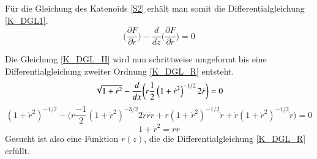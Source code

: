 \begin{refsection}
Für die Gleichung des Katenoids \eqref{S2} erhält man somit die Differentialgleichung \eqref{K_DGL1}.
\begin{equation} \label{K_DGL1}
\bigg(\frac{\partial F}{\partial r}\bigg)- \frac{d}{dz} \bigg(\frac{\partial F}{\partial \dot{r}}\bigg)=0    
\end{equation}

Die Gleichung \eqref{K_DGL_H} wird nun schrittweise umgeformt bis eine  Differentialgleichung zweiter Ordnung \eqref{K_DGL_R} entsteht.
\begin{equation} \label{K_DGL_H}
\sqrt{1+{\dot {r}}^2}-\frac{ d }{ dx } \bigg( r \frac{ 1 }{2  }\left( {1+{\dot {r}}^2}  \right)^{-1/2} 2 \dot {r}\bigg)=0
\\
\end{equation}
\begin{equation} \label{K_DGL_H2}
\left(1+{\dot {r}}^2  \right)^{-1/2}-\bigg(r \frac{ -1 }{2  } \left({1+{\dot {r}}^2}  \right)^{-3/2} 2 \dot{r} \ddot{r}  \dot{r}+ r \left({1+{\dot {r}}^2}  \right)^{-1/2} \ddot{r} +\dot{r} \left({1+{\dot {r}}^2}  \right)^{-1/2} \dot{r}\bigg)=0
\end{equation}
\begin{equation} \label{K_DGL_R}
1+{\dot {r}}^2=r  \ddot{r}
\end{equation}
Gesucht ist also eine Funktion $r(z)$, die die Differentialgleichung \eqref{K_DGL_R} erfüllt.


\end{refsection}
